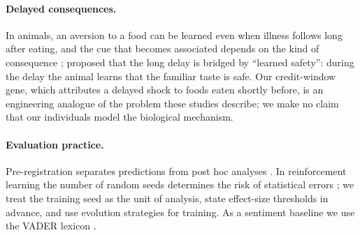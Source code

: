 \paragraph{Delayed consequences.}
In animals, an aversion to a food can be learned even when illness follows long after eating, and the cue that becomes associated depends on the kind of consequence \citep{garcia1966}; \citet{kalat1973} proposed that the long delay is bridged by ``learned safety'': during the delay the animal learns that the familiar taste is safe. Our credit-window gene, which attributes a delayed shock to foods eaten shortly before, is an engineering analogue of the problem these studies describe; we make no claim that our individuals model the biological mechanism.

\paragraph{Evaluation practice.}
Pre-registration separates predictions from post hoc analyses \citep{nosek2018}. In reinforcement learning the number of random seeds determines the risk of statistical errors \citep{colas2018}; we treat the training seed as the unit of analysis, state effect-size thresholds in advance, and use evolution strategies \citep{salimans2017} for training. As a sentiment baseline we use the VADER lexicon \citep{hutto2014}.
